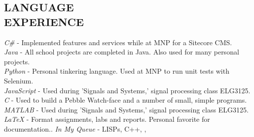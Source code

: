 \documentclass[margin]{res}
\begin{document}
\begin{resume}
\section{LANGUAGE \\ EXPERIENCE} 
{\sl C\#} - Implemented features and services while at MNP for a Sitecore CMS.\\
{\sl Java} - All school projects are completed in Java. Also used for many personal projects.\\
{\sl Python} - Personal tinkering language. Used at MNP to run unit tests with Selenium.\\
{\sl JavaScript} - Used during 'Signals and Systems,' signal processing class ELG3125.\\
{\sl C} - Used to build a Pebble Watch-face and a number of small, simple programs.\\
{\sl MATLAB} - Used during 'Signals and Systems,' signal processing class ELG3125.\\
{\sl LaTeX} -  Format assignments, labs and reports. Personal favorite for documentation..
{\sl In My Queue} - LISPs, C++, , 


\end{resume}
\end{document}
